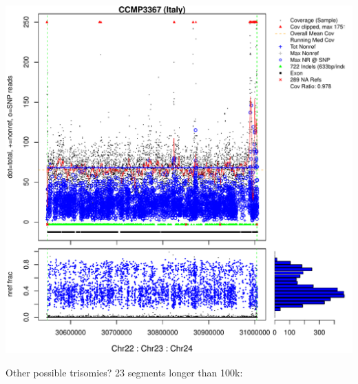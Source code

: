 \documentclass{article}\usepackage[]{graphicx}\usepackage[]{color}
\makeatletter
\def\maxwidth{ %
  \ifdim\Gin@nat@width>\linewidth
    \linewidth
  \else
    \Gin@nat@width
  \fi
}
\newenvironment{knitrout}{}{} %
\makeatother
\begin{document}
\begin{knitrout}
{\includegraphics[width=\maxwidth]{figs-knitr/unnamed-chunk-42-7} 

}



\end{knitrout}

Other possible trisomies?  23 segments longer than 100k:
\end{document}
